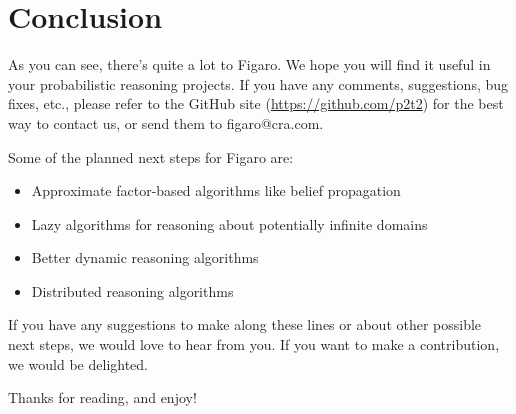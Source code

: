 
\chapter{Conclusion} %

\label{Conclusion} %


As you can see, there's quite a lot to Figaro. We hope you will find it useful in your probabilistic reasoning projects. If you have any comments, suggestions, bug fixes, etc., please refer to the GitHub site (\url{https://github.com/p2t2}) for the best way to contact us, or send them to figaro@cra.com.

Some of the planned next steps for Figaro are:
\begin{itemize}
\item Approximate factor-based algorithms like belief propagation
\item Lazy algorithms for reasoning about potentially infinite domains
\item Better dynamic reasoning algorithms
\item Distributed reasoning algorithms
\end{itemize}

If you have any suggestions to make along these lines or about other possible next steps, we would love to hear from you. If you want to make a contribution, we would be delighted.

Thanks for reading, and enjoy!
